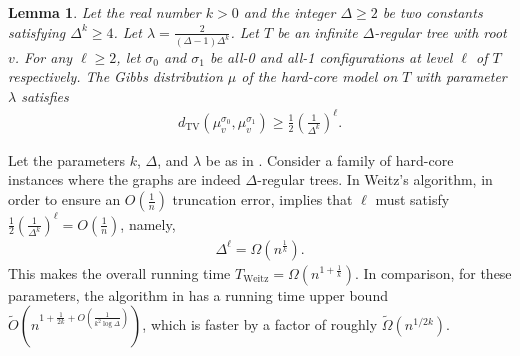 \documentclass[11pt]{amsart}
\newcommand{\tp}[1]{{\left( #1 \right)}}
\newtheorem{lemma}[theorem]{Lemma}
\theoremstyle{definition}
\theoremstyle{remark}
\newcommand{\dTV}{d_{\mathrm{TV}}}
\begin{document}
\begin{lemma}\label{lemma-inf-lower}
Let the real number $k > 0$ and the integer $\Delta \geq 2$ be two constants satisfying $\Delta^k \geq 4$.
Let  $\lambda = \frac{2}{(\Delta - 1)\Delta^{k}}$.
Let $T$ be an infinite $\Delta$-regular tree with root $v$.
For any $\ell \geq 2$, let $\sigma_0$ and $\sigma_1$ be all-0 and all-1 configurations at level $\ell$ of $T$ respectively.
The Gibbs distribution $\mu$ of the hard-core model on $T$ with parameter $\lambda$ satisfies 
\begin{align*}
	\dTV(\mu_v^{\sigma_0},\mu_v^{\sigma_1}) \geq \frac{1}{2}\tp{\frac{1}{\Delta^k}}^{\ell}.
\end{align*}
\end{lemma}

Let the parameters $k$, $\Delta$, and $\lambda$ be as in .
%
Consider a family of hard-core instances where the graphs are indeed $\Delta$-regular trees.
%
In Weitz's algorithm, in order to ensure an $O(\frac{1}{n})$ truncation error,
 implies that $\ell$ must satisfy $\frac{1}{2}\tp{\frac{1}{\Delta^k}}^{\ell} = O(\frac{1}{n})$,
namely,
\begin{align*}
	\Delta^\ell = \Omega(n^{\frac{1}{k}}).
\end{align*}
This makes the overall running time $T_{\mathrm{Weitz}}  = \Omega(n^{1 + \frac{1}{k}})$.
In comparison, for these parameters, the algorithm in  has a running time upper bound $\widetilde{O}\left(n^{1+\frac{1}{2k}+O(\frac{1}{k^2\log\Delta})}\right)$,
which is faster by a factor of roughly $\widetilde{\Omega}(n^{1/2k})$.


\end{document}
